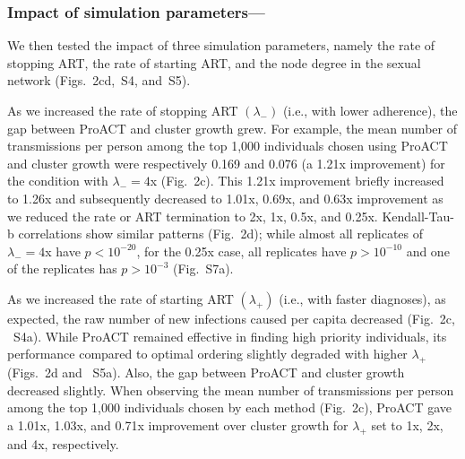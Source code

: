 \documentclass[oupdraft]{sysbio}
\begin{document}
\subsubsection{Impact of simulation parameters---}
We then tested the impact of three simulation parameters, namely the rate of stopping ART, the rate of starting ART, and the node degree in the sexual network (Figs.~2cd,~S4, and~S5).

As we increased the rate of stopping ART $\left(\lambda_{-}\right)$ (i.e., with lower adherence), the gap between ProACT and cluster growth grew.
For example, the mean number of transmissions per person among the top 1,000 individuals chosen using ProACT and cluster growth were respectively 0.169 and 0.076 (a 1.21x improvement) for the condition with $\lambda_-=4$x (Fig.~2c). 
This 1.21x improvement briefly increased to 1.26x and subsequently decreased to 1.01x, 0.69x, and 0.63x improvement as we reduced the rate or ART termination to 2x, 1x, 0.5x, and 0.25x.
Kendall-Tau-b correlations show similar patterns (Fig.~2d);
while almost all replicates of $\lambda_-=4$x have $p<10^{-20}$, for the 0.25x case, all replicates have $p>10^{-10}$ and one of the replicates has $p>10^{-3}$  (Fig.~S7a).
    






As we increased the rate of starting ART $\left(\lambda_{+}\right)$ (i.e., with faster diagnoses), as expected, the raw number of new infections caused per capita  decreased (Fig.~2c, ~S4a).
While ProACT remained effective in finding high priority individuals,
its performance compared to optimal ordering slightly degraded with higher $\lambda_{+}$ (Figs.~2d and ~S5a).
Also, the gap between ProACT and cluster growth decreased slightly.
When observing the mean number of transmissions per person among the top 1,000 individuals chosen by each method (Fig.~2c),
ProACT gave a 1.01x, 1.03x, and 0.71x improvement over cluster growth for $\lambda_{+}$ set to 1x, 2x, and 4x, respectively.
\end{document}

